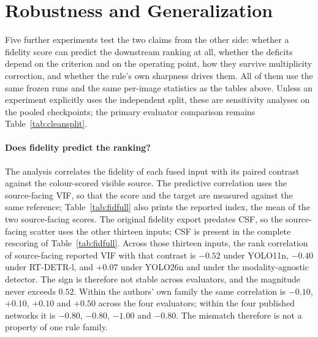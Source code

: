 \documentclass[10pt,a4paper]{article}
\begin{document}
\section{Robustness and Generalization}
\label{sec:additional}
\label{sec:extra}

\begin{sloppypar}
Five further experiments test the two claims from the other side: whether a fidelity
score can predict the downstream ranking at all, whether the deficits depend on the
criterion and on the operating point, how they survive multiplicity correction, and
whether the rule's own sharpness drives them. All of them use the same frozen runs and
the same per-image statistics as the tables above. Unless an experiment explicitly
uses the independent split, these are sensitivity analyses on the pooled checkpoints;
the primary evaluator comparison remains Table~\ref{tab:cleansplit}.

\paragraph{Does fidelity predict the ranking?} The analysis correlates the fidelity of
each fused input with its paired contrast against the colour-scored visible
source. The predictive correlation uses the source-facing VIF, so that the score and the
target are measured against the same reference; Table~\ref{tab:fidfull} also prints the
reported index, the mean of the two source-facing scores. The original fidelity export
predates CSF, so the source-facing scatter uses the other thirteen inputs; CSF is present
in the complete rescoring of Table~\ref{tab:fidfull}. Across those thirteen inputs, the
rank correlation of source-facing reported VIF with that contrast is
$-0.52$ under YOLO11n, $-0.40$ under RT-DETR-l, and $+0.07$ under YOLO26n and under the
modality-agnostic detector. The sign is therefore not stable across evaluators, and the
magnitude never exceeds $0.52$. Within the authors' own family the same correlation is
$-0.10$, $+0.10$, $+0.10$ and $+0.50$ across the four evaluators; within the four
published networks it is $-0.80$, $-0.80$, $-1.00$ and $-0.80$. The mismatch therefore
is not a property of one rule family.


\end{sloppypar}
\end{document}
